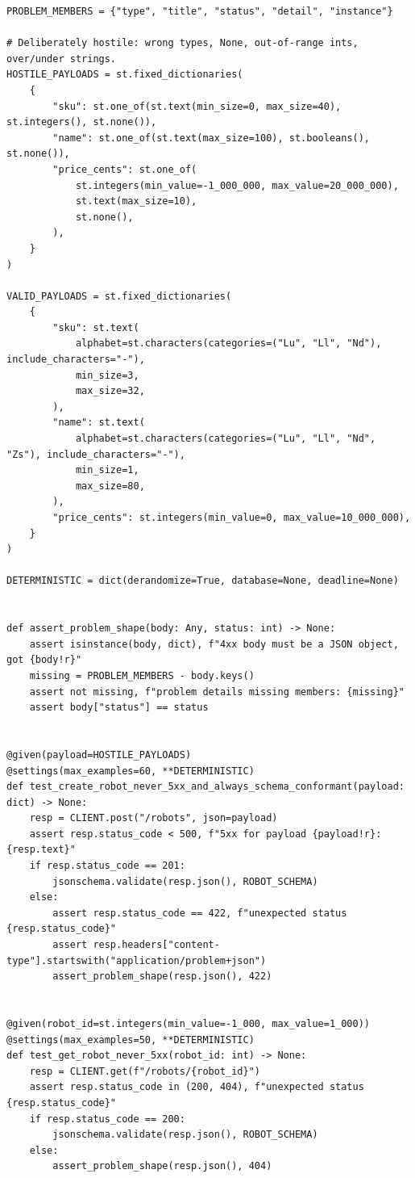 \begin{verbatim}
PROBLEM_MEMBERS = {"type", "title", "status", "detail", "instance"}

# Deliberately hostile: wrong types, None, out-of-range ints, over/under strings.
HOSTILE_PAYLOADS = st.fixed_dictionaries(
    {
        "sku": st.one_of(st.text(min_size=0, max_size=40), st.integers(), st.none()),
        "name": st.one_of(st.text(max_size=100), st.booleans(), st.none()),
        "price_cents": st.one_of(
            st.integers(min_value=-1_000_000, max_value=20_000_000),
            st.text(max_size=10),
            st.none(),
        ),
    }
)

VALID_PAYLOADS = st.fixed_dictionaries(
    {
        "sku": st.text(
            alphabet=st.characters(categories=("Lu", "Ll", "Nd"), include_characters="-"),
            min_size=3,
            max_size=32,
        ),
        "name": st.text(
            alphabet=st.characters(categories=("Lu", "Ll", "Nd", "Zs"), include_characters="-"),
            min_size=1,
            max_size=80,
        ),
        "price_cents": st.integers(min_value=0, max_value=10_000_000),
    }
)

DETERMINISTIC = dict(derandomize=True, database=None, deadline=None)


def assert_problem_shape(body: Any, status: int) -> None:
    assert isinstance(body, dict), f"4xx body must be a JSON object, got {body!r}"
    missing = PROBLEM_MEMBERS - body.keys()
    assert not missing, f"problem details missing members: {missing}"
    assert body["status"] == status


@given(payload=HOSTILE_PAYLOADS)
@settings(max_examples=60, **DETERMINISTIC)
def test_create_robot_never_5xx_and_always_schema_conformant(payload: dict) -> None:
    resp = CLIENT.post("/robots", json=payload)
    assert resp.status_code < 500, f"5xx for payload {payload!r}: {resp.text}"
    if resp.status_code == 201:
        jsonschema.validate(resp.json(), ROBOT_SCHEMA)
    else:
        assert resp.status_code == 422, f"unexpected status {resp.status_code}"
        assert resp.headers["content-type"].startswith("application/problem+json")
        assert_problem_shape(resp.json(), 422)


@given(robot_id=st.integers(min_value=-1_000, max_value=1_000))
@settings(max_examples=50, **DETERMINISTIC)
def test_get_robot_never_5xx(robot_id: int) -> None:
    resp = CLIENT.get(f"/robots/{robot_id}")
    assert resp.status_code in (200, 404), f"unexpected status {resp.status_code}"
    if resp.status_code == 200:
        jsonschema.validate(resp.json(), ROBOT_SCHEMA)
    else:
        assert_problem_shape(resp.json(), 404)



\end{verbatim}
